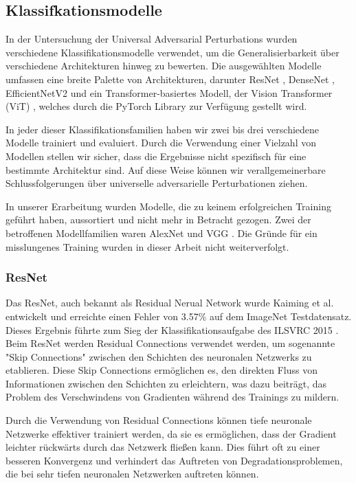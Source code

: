 \subsection{Klassifkationsmodelle}

In der Untersuchung der Universal Adversarial Perturbations wurden verschiedene Klassifikationsmodelle verwendet, um die Generalisierbarkeit über verschiedene Architekturen hinweg zu bewerten. Die ausgewählten Modelle umfassen eine breite Palette von Architekturen, darunter ResNet \cite{he_deep_2015}, DenseNet \cite{huang_densely_2018}, EfficientNetV2 \cite{tan_efficientnetv2_2021} und ein Transformer-basiertes Modell, der Vision Transformer (ViT) \cite{dosovitskiy_image_2021}, welches durch die PyTorch Library zur Verfügung gestellt wird.

In jeder dieser Klassifikationsfamilien haben wir zwei bis drei verschiedene Modelle trainiert und evaluiert. Durch die Verwendung einer Vielzahl von Modellen stellen wir sicher, dass die Ergebnisse nicht spezifisch für eine bestimmte Architektur sind. Auf diese Weise können wir verallgemeinerbare Schlussfolgerungen über universelle adversarielle Perturbationen ziehen.

In unserer Erarbeitung wurden Modelle, die zu keinem erfolgreichen Training geführt haben, aussortiert und nicht mehr in Betracht gezogen. Zwei der betroffenen Modellfamilien waren AlexNet \cite{krizhevsky_imagenet_2012} und VGG \cite{simonyan_very_2015}. Die Gründe für ein misslungenes Training wurden in dieser Arbeit nicht weiterverfolgt.


\subsubsection{ResNet}
Das ResNet, auch bekannt als Residual Nerual Network wurde Kaiming et al. \cite{he_deep_2015} entwickelt und erreichte einen Fehler von 3.57\% auf dem ImageNet Testdatensatz. Dieses Ergebnis führte zum Sieg der Klassifikationsaufgabe des ILSVRC 2015 . Beim ResNet werden Residual Connections verwendet werden, um sogenannte "Skip Connections" zwischen den Schichten des neuronalen Netzwerks zu etablieren. Diese Skip Connections ermöglichen es, den direkten Fluss von Informationen zwischen den Schichten zu erleichtern, was dazu beiträgt, das Problem des Verschwindens von Gradienten während des Trainings zu mildern.

Durch die Verwendung von Residual Connections können tiefe neuronale Netzwerke effektiver trainiert werden, da sie es ermöglichen, dass der Gradient leichter rückwärts durch das Netzwerk fließen kann. Dies führt oft zu einer besseren Konvergenz und verhindert das Auftreten von Degradationsproblemen, die bei sehr tiefen neuronalen Netzwerken auftreten können.

